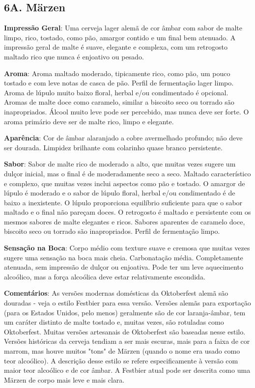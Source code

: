 \subsection*{6A. Märzen}
\textbf{Impressão Geral}: Uma cerveja lager alemã de cor âmbar com sabor de malte limpo, rico, tostado, como pão, amargor contido e um final bem atenuado. A impressão geral de malte é suave, elegante e complexa, com um retrogosto maltado rico que nunca é enjoativo ou pesado.

\textbf{Aroma}: Aroma maltado moderado, tipicamente rico, como pão, um pouco tostado e com leve notas de casca de pão. Perfil de fermentação lager limpo. Aroma de lúpulo muito baixo floral, herbal e/ou condimentado é opcional. Aromas de malte doce como caramelo, similar a biscoito seco ou torrado são inapropriados. Álcool muito leve pode ser percebido, mas nunca deve ser forte. O aroma primário deve ser de malte rico, limpo e elegante.

\textbf{Aparência}: Cor de âmbar alaranjado a cobre avermelhado profundo; não deve ser dourada. Limpidez brilhante com colarinho quase branco persistente.

\textbf{Sabor}: Sabor de malte rico de moderado a alto, que muitas vezes sugere um dulçor inicial, mas o final é de moderadamente seco a seco. Maltado característico e complexo, que muitas vezes inclui aspectos como pão e tostado. O amargor de lúpulo é moderado e o sabor de lúpulo floral, herbal e/ou condimentado é de baixo a inexistente. O lúpulo proporciona equilíbrio suficiente para que o sabor maltado e o final não pareçam doces. O retrogosto é maltado e persistente com os mesmos sabores de malte elegantes e ricos. Sabores aparentes de caramelo doce, biscoito seco ou torrado são inapropriados. Perfil de fermentação limpo.

\textbf{Sensação na Boca}: Corpo médio com texture suave e cremosa que muitas vezes sugere uma sensação na boca mais cheia. Carbonatação média. Completamente atenuada, sem impressão de dulçor ou enjoativa. Pode ter um leve aquecimento alcoólico, mas a força alcoólica deve estar relativamente escondida.

\textbf{Comentários}: As versões modernas domésticas da Oktoberfest alemã são douradas - veja o estilo Festbier para essa versão. Versões alemãs para exportação (para os Estados Unidos, pelo menos) geralmente são de cor laranja-âmbar, tem um caráter distinto de malte tostado e, muitas vezes, são rotuladas como Oktoberfest. Muitas versões artesanais de Oktoberfest são baseadas nesse estilo. Versões históricas da cerveja tendiam a ser mais escuras, mais para a faixa de cor marrom, mas houve muitos "tons" de Märzen (quando o nome era usado como teor alcoólico). A descrição desse estilo se refere especificamente à versão com maior teor alcoólico e de cor âmbar. A Festbier atual pode ser descrita como uma Märzen de corpo mais leve e mais clara.

